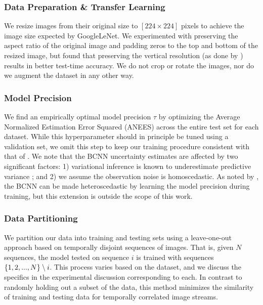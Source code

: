 \subsubsection{Data Preparation \& Transfer Learning}
We resize images from their original size to $[224 \times 224]$ pixels to achieve the image size expected by GoogleLeNet. 
We experimented with preserving the aspect ratio of the original image and padding zeros to the top and bottom of the resized image, but found that preserving the vertical resolution (as done by \citet{Ma2016-at}) results in better test-time accuracy. We do not crop or rotate the images, nor do we augment the dataset in any other way.

\subsubsection{Model Precision}
We find an empirically optimal model precision $\tau$ by optimizing the Average Normalized Estimation Error Squared (ANEES) across the entire test set for each dataset. 
While this hyperparameter should in principle be tuned using a validation set, we omit this step to keep our training procedure consistent with that of \citet{Ma2016-at}. 
We note that the BCNN uncertainty estimates are affected by two significant factors: 1) variational inference is known to underestimate predictive variance  \citep{Gal2016UncertaintyThesis}; and 2) we assume the observation noise is homoscedastic. 
As noted by \citet{Gal2016UncertaintyThesis}, the BCNN can be made heteroscedastic by learning the model precision during training, but this extension is outside the scope of this work.

\subsubsection{Data Partitioning}
    We partition our data into training and testing sets using a leave-one-out approach based on temporally disjoint sequences of images. That is, given $N$ sequences, the model tested on sequence $i$ is trained with sequences $\left\{1,2,..., N\right\} \setminus i$. This process varies based on the dataset, and we discuss the specifics in the experimental discussion corresponding to each. In contrast to  randomly holding out a subset of the data, this method minimizes the similarity of training and testing data for temporally correlated image streams.

